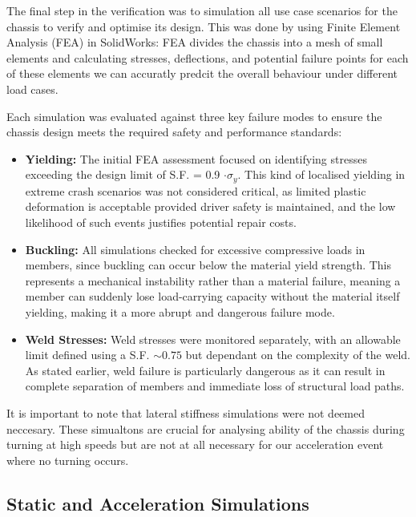The final step in the verification was to simulation all use case scenarios for the chassis to verify and optimise its design. This was done by using Finite Element Analysis (FEA) \cite{irjet2019fea} in SolidWorks: FEA divides the chassis into a mesh of small elements and calculating stresses, deflections, and potential failure points for each of these elements we can accuratly predcit the overall behaviour under different load cases.

Each simulation was evaluated against three key failure modes to ensure the chassis design meets the required safety and performance standards:

\begin{itemize}
    \item \textbf{Yielding:} The initial FEA assessment focused on identifying stresses exceeding the design limit of S.F. = 0.9 $\cdot \sigma_y$. This kind of localised yielding in extreme crash scenarios was not considered critical, as limited plastic deformation is acceptable provided driver safety is maintained, and the low likelihood of such events justifies potential repair costs.
    \item \textbf{Buckling:} All simulations checked for excessive compressive loads in members, since buckling can occur below the material yield strength. This represents a mechanical instability rather than a material failure, meaning a member can suddenly lose load-carrying capacity without the material itself yielding, making it a more abrupt and dangerous failure mode. 
    \item \textbf{Weld Stresses:} Weld stresses were monitored separately, with an allowable limit defined using a S.F. $\sim 0.75$ but dependant on the complexity of the weld. As stated earlier, weld failure is particularly dangerous as it can result in complete separation of members and immediate loss of structural load paths.
\end{itemize}

It is important to note that lateral stiffness simulations were not deemed neccesary. These simualtons are crucial for analysing ability of the chassis during turning at high speeds but are not at all necessary for our acceleration event where no turning occurs.

\subsection{Static and Acceleration Simulations}
\label{sec:static_acc_load}

